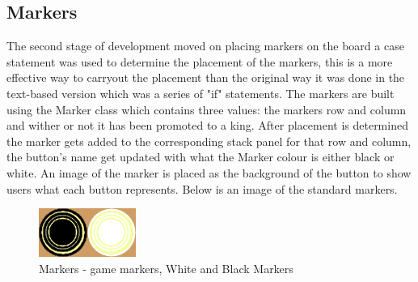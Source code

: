 \documentclass[10pt, a4paper]{article}
\begin{document}
	\subsection{Markers}
	The second stage of development moved on placing markers on the board a case statement was used to determine the placement of the markers, this is a more effective way to carryout the placement than the original way it was done in the text-based version which was a series of "if" statements. The markers are built using the Marker class which contains three values: the markers row and column and wither or not it has been promoted to a king. After placement is determined the marker gets added to the corresponding stack panel for that row and column, the button's name get updated with what the Marker colour is either black or white. An image of the marker is placed as the background of the button to show users what each button represents. Below is an image of the standard markers.
	\begin{figure}[H]
  	\centering
  	\includegraphics[scale = 1.25]{Marker}
	\caption{Markers - game markers, White and Black Markers}
  	\label{fig:nonfloat}
	\end{figure}
	
\end{document}
